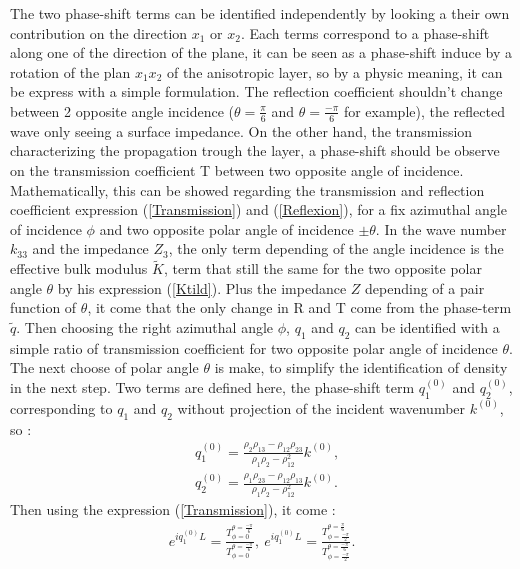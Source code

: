 \documentclass{article}
\begin{document}
    The two phase-shift terms can be identified independently by looking a their own contribution on the direction $x_1$ or $x_2$. Each terms correspond to a phase-shift along one of the direction of the plane, it can be seen as a phase-shift induce by a rotation of the plan $x_1x_2$ of the anisotropic layer, so by a physic meaning, it can be express with a simple formulation. The reflection coefficient shouldn't change between 2 opposite angle incidence ($\theta=\frac{\pi}{6}$ and $\theta=\frac{-\pi}{6}$ for example), the reflected wave only seeing a surface impedance. On the other hand, the transmission characterizing the propagation trough the layer, a phase-shift should be observe on the transmission coefficient T between two opposite angle of incidence. Mathematically, this can be showed regarding the transmission and reflection coefficient expression (\ref{Transmission}) and (\ref{Reflexion}), for a fix azimuthal angle of incidence $\phi$ and two opposite polar angle of incidence $\pm \theta$. In the wave number $k_{33}$ and the impedance $Z_3$, the only term depending of the angle incidence is the effective bulk modulus $\tilde{K}$, term that still the same for the two opposite polar angle $\theta$ by his expression (\ref{Ktild}). Plus the impedance $Z$ depending of a pair function of $\theta$, it come that the only change in R and T come from the phase-term $\tilde{q}$. Then choosing the right azimuthal angle $\phi$, $q_1$ and $q_2$ can be identified with a simple ratio of transmission coefficient for two opposite polar angle of incidence $\theta$. The next choose of polar angle $\theta$ is make, to simplify the identification of density in the next step. Two terms are defined here, the phase-shift term $q_1^{(0)}$ and $q_2^{(0)}$, corresponding to $q_1$ and $q_2$ without projection of the incident wavenumber $k^{(0)}$, so :
    \begin{align}
        &q_1^{(0)}=\frac{\rho_2\rho_{13}-\rho_{12}\rho_{23}}{\rho_1\rho_2-\rho_{12}^2}k^{(0)},\\
        &q_2^{(0)}=\frac{\rho_1\rho_{23}-\rho_{12}\rho_{13}}{\rho_1\rho_2-\rho_{12}^2}k^{(0)}.
    \end{align}
    Then using the expression (\ref{Transmission}), it come :
    \begin{align}
     e^{iq_1^{(0)}L}=\frac{T^{\theta=\frac{-\pi}{6}}_{\phi=0}}{T^{\theta=\frac{-\pi}{6}}_{\phi=0}},\ e^{iq_1^{(0)}L}=\frac{T^{\theta=\frac{\pi}{6}}_{\phi=\frac{-\pi}{2}}}{T^{\theta=\frac{-\pi}{6}}_{\phi=\frac{-\pi}{2}}}.
    \end{align}
    
\end{document}
